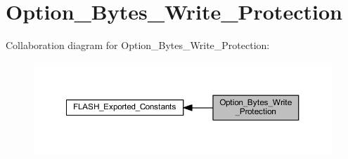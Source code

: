 \hypertarget{group___option___bytes___write___protection}{}\section{Option\+\_\+\+Bytes\+\_\+\+Write\+\_\+\+Protection}
\label{group___option___bytes___write___protection}
Collaboration diagram for Option\+\_\+\+Bytes\+\_\+\+Write\+\_\+\+Protection\+:
\nopagebreak
\begin{figure}[H]
\begin{center}
\leavevmode
\includegraphics[width=350pt]{group___option___bytes___write___protection}
\end{center}
\end{figure}
